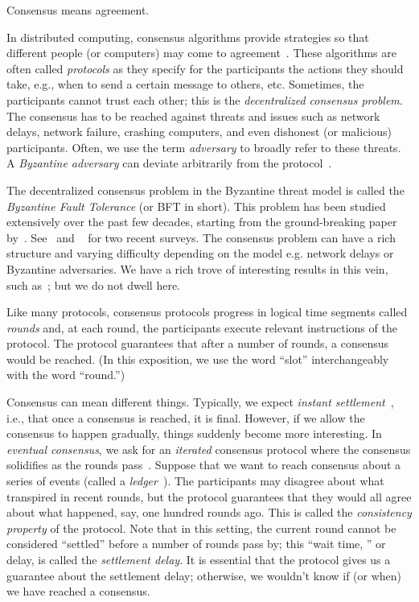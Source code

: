 




Consensus means agreement.

In distributed computing, 
consensus algorithms provide strategies 
so that different people (or computers) 
may come to agreement~\cite{BFT,PBFT,Paxos,Nakamoto2008,HoneyBadger,Zyzzyva,Streamlet,Algorand,Ouroboros,SnowWhite,Hotstuff}. 
These algorithms are often called \emph{protocols} as they 
specify for the participants 
the actions they should take, 
e.g., when to send a certain message to others, etc. 
Sometimes, the participants cannot trust each other; 
this is the \emph{decentralized consensus problem}. 
The consensus has to be reached against threats and issues such as 
network delays, network failure, crashing computers, and even 
dishonest (or malicious) participants. 
Often, we use the term \emph{adversary} to broadly refer to these threats. 
A \emph{Byzantine adversary} can deviate arbitrarily from the protocol~\cite{BFT}. 


The decentralized consensus problem in the Byzantine threat model 
is called the \emph{Byzantine Fault Tolerance} (or BFT in short). 
This problem has been studied extensively over the past few decades, 
starting from the ground-breaking paper by~\citet{BFT}. 
See~\citet{GK18} and ~\citet{ConsensusBlockchain} for two recent surveys.
The consensus problem can have a rich structure and varying difficulty 
depending on the model e.g. network delays or Byzantine adversaries. 
We have a rich trove of interesting results in this vein, such as~\cite{DworkLynch,FLP}; 
but we do not dwell here.

Like many protocols, consensus protocols 
progress in logical time segments called \emph{rounds} 
and, at each round, the participants execute relevant instructions of the protocol. 
The protocol guarantees that after a number of rounds, 
a consensus would be reached. 
(In this exposition, 
we use the word ``slot'' interchangeably with the word ``round.'')

Consensus can mean different things. 
Typically, we expect \emph{instant settlement}~\cite{BFT,Paxos,PBFT}, 
i.e., that once a consensus is reached, 
it is final. 
However, if we allow the consensus to happen gradually, 
things suddenly become more interesting.
In \emph{eventual consensus}, 
we ask for an \emph{iterated} consensus protocol 
where the consensus solidifies as the rounds pass~\cite{Nakamoto2008,Ouroboros,SnowWhite,GK18}. 
Suppose that we want to reach consensus about a series of events 
(called a \emph{ledger}~\cite{GKL,GK18}). 
The participants may disagree about what transpired in recent rounds, 
but the protocol guarantees that they would all agree about 
what happened, say, one hundred rounds ago. 
This is called the \emph{consistency property} of the protocol. 
Note that in this setting, 
the current round cannot be considered ``settled'' 
before a number of rounds pass by; 
this ``wait time, '' or delay, is called the \emph{settlement delay}. 
It is essential that the protocol gives us a guarantee 
about the settlement delay;
otherwise, we wouldn't know if (or when) we have reached a consensus.

